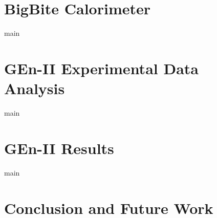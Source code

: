 \chapter{BigBite Calorimeter}
\label{cht:BBCal}
{main}
\setcounter{equation}{0}
\cleardoublepage

\chapter{GEn-II Experimental Data Analysis}
\label{cht:analysis}
{main}
\setcounter{equation}{0}
\cleardoublepage

\chapter{GEn-II Results}
\label{cht:results}
{main}
\setcounter{equation}{0}
\cleardoublepage

\chapter{Conclusion and Future Work}
\label{cht:proj3}

